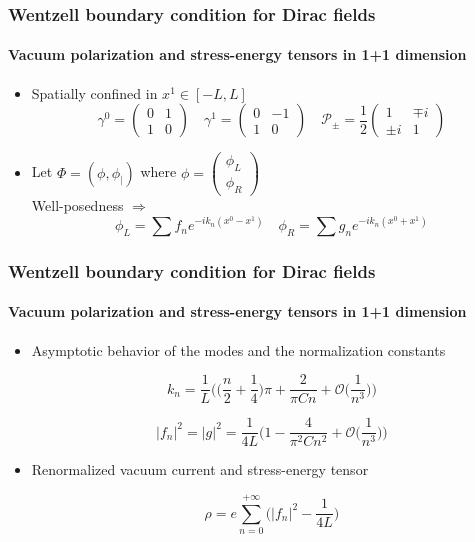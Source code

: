 \documentclass[french]{beamer}
\begin{document}
\begin{frame}
\frametitle{Wentzell boundary condition for Dirac fields}
\framesubtitle{Vacuum polarization and stress-energy tensors in 1+1 dimension}

\begin{itemize}

\item Spatially confined in $x^1 \in [-L, L]$
\begin{equation*}
\gamma^0 = \begin{pmatrix} 0 & 1 \\ 1 & 0 \end{pmatrix} \quad
\gamma^1 = \begin{pmatrix} 0 & -1 \\ 1 & 0 \end{pmatrix}
\quad
 \mathcal{P}_\pm = \frac 1 2  \begin{pmatrix} 1 & \mp i \\ \pm i & 1 \end{pmatrix}
\end{equation*}

\item Let $\Phi = (\phi, \phi_|)$ where $\phi = \begin{pmatrix} \phi_L \\ \phi_R \end{pmatrix}$ \\
Well-posedness $\Longrightarrow$
\begin{equation*}
\phi_L = \sum f_n e^{-ik_n(x^0 - x^1)} \quad
\phi_R = \sum g_n e^{-ik_n(x^0 + x^1)}
\end{equation*}
\end{itemize}
\end{frame}
\begin{frame}
\frametitle{Wentzell boundary condition for Dirac fields}
\framesubtitle{Vacuum polarization and stress-energy tensors in 1+1 dimension}

\begin{itemize}
\item Asymptotic behavior of the modes and the normalization constants

\begin{equation*}
k_n = \frac 1 L \Big( \big( \frac n 2 + \frac 1 4 \big)\pi + \frac{2}{\pi C n}+ \mathcal{O}\big(\frac{1}{n^3}\big) \Big)
\end{equation*}

\begin{equation*}
|f_n|^2 = |g|^2=
\frac{1}{4L}\Big( 1 - \frac{4}{\pi^2C n^2} + \mathcal{O}\big(\frac{1}{n^3}\big) \Big)
\end{equation*}

\item Renormalized vacuum current and stress-energy tensor

\begin{equation*}
\rho = e \sum_{n=0}^{+\infty}\big(|f_n|^2 -\frac{1}{4L} \big)
\end{equation*}


\end{itemize}
\end{frame}
\end{document}
